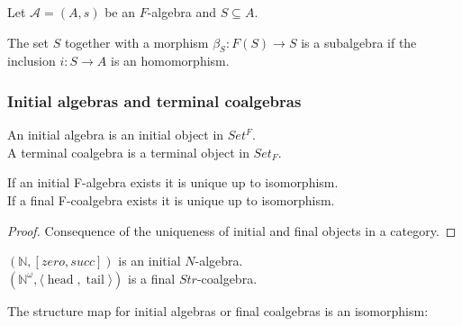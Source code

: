\begin{definition}[Subalgebras]
	Let $\mathcal{A} = (A,s)$ be an $F$-algebra and $S \subseteq A$. 
	
	The set $S$ together with a morphism $\beta_S:F(S) \to S$ is a subalgebra if the inclusion $i: S \to A$ is an homomorphism. 
\end{definition}

\subsubsection{Initial algebras and terminal coalgebras}

\begin{definition}
	An initial algebra is an initial object in $Set^F$. \\
	A terminal coalgebra is a terminal object in $Set_F$.
\end{definition}

\begin{corollary}
	If an initial F-algebra exists it is unique up to isomorphism. \\
	If a final F-coalgebra exists it is unique up to isomorphism.
\end{corollary}
\begin{proof}
	Consequence of the uniqueness of initial and final objects in a category.
\end{proof}

\begin{example}
$(\mathbb{N},[zero,succ])$ is an initial $N$-algebra.\\
$(\mathbb{N}^{\omega}, \langle \operatorname{head}, \operatorname{tail} \rangle)$ is a final $Str$-coalgebra.
\end{example}

The structure map for initial algebras or final coalgebras is an isomorphism:

